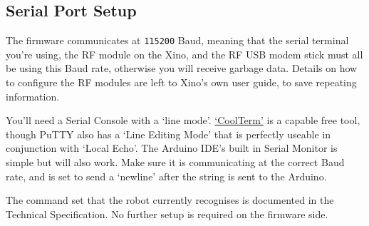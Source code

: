 \subsection{Serial Port Setup}

The firmware communicates at \texttt{115200} Baud, meaning that the serial terminal you're using, the RF module on the Xino, and the RF USB modem stick must all be using this Baud rate, otherwise you will receive garbage data. Details on how to configure the RF modules are left to Xino's own user guide, to save repeating information.

You'll need a Serial Console with a `line mode'. \href{http://freeware.the-meiers.org/}{`CoolTerm'} is a capable free tool, though PuTTY also has a `Line Editing Mode' that is perfectly useable in conjunction with `Local Echo'. The Arduino IDE's built in Serial Monitor is simple but will also work. Make sure it is communicating at the correct Baud rate, and is set to send a `newline' after the string is sent to the Arduino.

The command set that the robot currently recognises is documented in the Technical Specification. No further setup is required on the firmware side.

